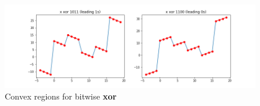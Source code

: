 \documentclass[11pt]{article}
\theoremstyle{definition}
\begin{document}
\begin{figure}[h!]
  \centering
  \includegraphics[width=\linewidth]{figs/xor.png}
  \caption{Convex regions for bitwise \textbf{xor}}
\end{figure}
\end{document}

